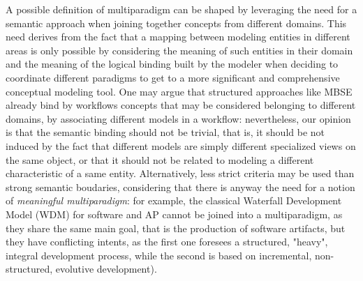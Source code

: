 A possible definition of multiparadigm can be shaped by leveraging the need for a semantic approach when joining together concepts from different domains. This need derives from the fact that a mapping between modeling entities in different areas is only possible by considering the meaning of such entities in their domain and the meaning of the logical binding built by the modeler when deciding to coordinate different paradigms to get to a more significant and comprehensive conceptual modeling tool. One may argue that structured approaches like MBSE already bind by workflows concepts that may be considered belonging to different domains, by associating different models in a workflow: nevertheless, our opinion is that the semantic binding should not be trivial, that is, it should be not induced by the fact that different models are simply different specialized views on the same object, or that it should not be related to modeling a different characteristic of a same entity. Alternatively, less strict criteria may be used than strong semantic boudaries, considering that there is anyway the need for a notion of \textit{meaningful multiparadigm}: for example, the classical Waterfall Development Model (WDM) for software and AP cannot be joined into a multiparadigm, as they share the same main goal, that is the production of software artifacts, but they have conflicting intents, as the first one foresees a structured, "heavy", integral development process, while the second is based on incremental, non-structured, evolutive development).

